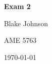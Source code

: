 \documentclass{article}
\newcommand{\coursenumber}{AME 5763}
\begin{document}
\begin{titlepage}
    \centering
    {\LARGE \bfseries Exam 2 \par}
    \vspace{1cm}
    {\Large Blake Johnson \par}
    \vspace{0.5cm}
    {\Large \coursenumber \par}
    \vfill
    {\large \today \par}
\end{titlepage}

\newpage %

\newpage

\newpage

\end{document}
